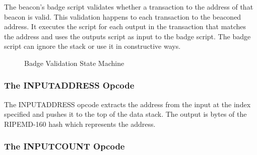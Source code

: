 \documentclass{article}
\begin{document}
The beacon's badge script validates whether a transaction to the address of that
beacon is valid.  This validation happens to each transaction to the beaconed address.
It executes the script for each output in the transaction that matches the address
and uses the outputs script as input to the badge script.  The badge script can
ignore the stack or use it in constructive ways.

\begin{figure}[H]
    \begin{center}
    \end{center}
    \caption{Badge Validation State Machine}
\end{figure}

\subsubsection{The INPUTADDRESS Opcode}

\begin{center}
\end{center}

The INPUTADDRESS \gls{opcode} extracts the address from the input at the index specified
and pushes it to the top of the data stack.  The output is bytes of the RIPEMD-160
hash which represents the address.

\subsubsection{The INPUTCOUNT Opcode}
\end{document}
